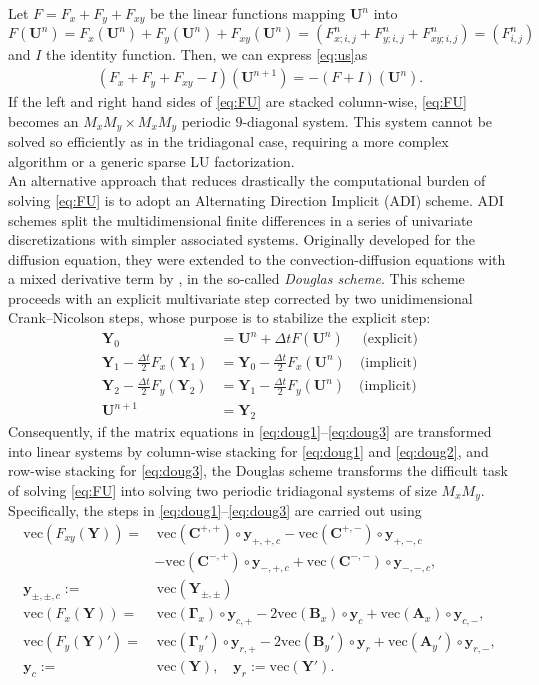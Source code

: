 \documentclass[oneside,11pt]{article}
\newcommand{\by}{\mathbf{y}}
\newcommand{\bY}{\mathbf{Y}}
\newcommand{\bU}{\mathbf{U}}
\newcommand{\bGamma}{\boldsymbol\Gamma}
\newcommand{\bB}{\mathbf{B}}
\newcommand{\bA}{\mathbf{A}}
\begin{document}
Let $F=F_x+F_y+F_{xy}$ be the linear functions mapping $\bU^n$ into $F(\bU^n)=F_x(\bU^n)+F_y(\bU^n)+F_{xy}(\bU^n)=(F^n_{x;i,j}+F^n_{y;i,j}+F^n_{xy;i,j})=(F^n_{i,j})$ and $I$ the identity function. Then, we can express \eqref{eq:us}\nolinebreak[4] as
\begin{align}
(F_x+F_y+F_{xy}-I)(\bU^{n+1})=-(F+I)(\bU^{n}).\label{eq:FU}
\end{align}
If the left and right hand sides of \eqref{eq:FU} are stacked column-wise, \eqref{eq:FU} becomes an $M_xM_y\times M_xM_y$ periodic $9$-diagonal system. This system cannot be solved so efficiently as in the tridiagonal case, requiring a more complex algorithm or a generic sparse LU factorization. \\

An alternative approach that reduces drastically the computational burden of solving \eqref{eq:FU} is to adopt an Alternating Direction Implicit (ADI) scheme. ADI schemes split the multidimensional finite differences in a series of univariate discretizations with simpler associated systems. Originally developed for the diffusion equation, they were extended to the convection-diffusion equations with a mixed de\-riv\-ative term by \cite{McKee1996}, in the so-called \textit{Douglas scheme}. This scheme proceeds with an explicit multivariate step corrected by two unidimensional Crank--Nicolson steps, whose purpose is to stabilize the explicit step:
\begin{align}
\bY_0&=\bU^{n}+\Delta t F(\bU^{n})\quad\text{ (explicit)}\label{eq:doug1}\\
\bY_1-\tfrac{\Delta t}{2} F_x(\bY_1)&=\bY_0-\tfrac{\Delta t}{2}F_x(\bU^{n})\quad\text{(implicit)}\label{eq:doug2}\\
\bY_2-\tfrac{\Delta t}{2} F_y(\bY_2)&=\bY_1-\tfrac{\Delta t}{2}F_y(\bU^{n})\quad\text{(implicit)}\label{eq:doug3}\\
\bU^{n+1}&=\bY_2\nonumber
\end{align}
Consequently, if the matrix equations in \eqref{eq:doug1}--\eqref{eq:doug3} are transformed into linear systems by column-wise stacking for \eqref{eq:doug1} and \eqref{eq:doug2}, and row-wise stacking for \eqref{eq:doug3}, the Douglas scheme transforms the difficult task of solving \eqref{eq:FU} into solving two periodic tridiagonal systems of size $M_xM_y$. Specifically, the steps in \eqref{eq:doug1}--\eqref{eq:doug3} are carried out using
\begin{align*}
\mathrm{vec}(F_{xy}(\bY))=&\,\mathrm{vec}(\mathbf{C}^{+,+})\circ\by_{+,+,c}-\mathrm{vec}(\mathbf{C}^{+,-})\circ\by_{+,-,c}\\
&-\mathrm{vec}(\mathbf{C}^{-,+})\circ\by_{-,+,c}+\mathrm{vec}(\mathbf{C}^{-,-})\circ\by_{-,-,c},\\
\by_{\pm,\pm,c}:=&\,\mathrm{vec}(\bY_{\pm,\pm})\\
\mathrm{vec}(F_x(\bY))=&\,\mathrm{vec}(\bGamma_x)\circ\by_{c,+}-2\mathrm{vec}(\bB_x)\circ\by_c+\mathrm{vec}(\bA_x)\circ\by_{c,-},\\
\mathrm{vec}(F_y(\bY)')=&\,\mathrm{vec}(\bGamma_y')\circ\by_{r,+}-2\mathrm{vec}(\bB_y')\circ\by_r+\mathrm{vec}(\bA_y')\circ\by_{r,-},\\
\by_c:=&\,\mathrm{vec}(\bY),\quad \by_r:=\mathrm{vec}(\bY').
\end{align*}
\end{document}
